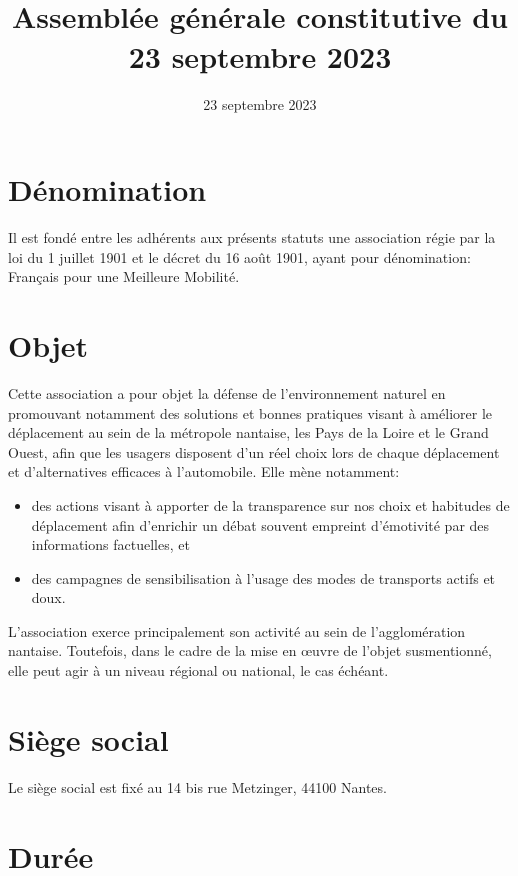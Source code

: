 \documentclass[11 pt]{article}
\title{\fmm \\[4mm]
\large Assemblée générale constitutive du 23 septembre 2023}
\date{23 septembre 2023}
\newcommand\fmm[0]{Français pour une Meilleure Mobilité}
\begin{document}
\maketitle

\section{Dénomination}

Il est fondé entre les adhérents aux présents statuts une association
régie par la loi du 1\ier{} juillet 1901 et le décret du 16 août 1901,
ayant pour dénomination: \og\fmm\fg.


\section{Objet}

Cette association a pour objet la défense de l’environnement naturel
en promouvant notamment des solutions et bonnes pratiques visant à
améliorer le déplacement au sein de la métropole nantaise, les Pays de
la Loire et le Grand Ouest, afin que les usagers disposent d’un réel
choix lors de chaque déplacement et d’alternatives efficaces à
l’automobile. Elle mène notamment:

\begin{itemize}
\item des actions visant à apporter de la transparence sur nos choix
  et habitudes de déplacement afin d’enrichir un débat souvent
  empreint d’émotivité par des informations factuelles, et
\item des campagnes de sensibilisation à l’usage des modes de
  transports actifs et doux.
\end{itemize}

L’association exerce principalement son activité au sein de
l’agglomération nantaise. Toutefois, dans le cadre de la mise en
œuvre de l’objet susmentionné, elle peut agir à un niveau régional ou
national, le cas échéant.

\section{Siège social}

Le siège social est fixé au 14 bis rue Metzinger, 44100 Nantes.

\section{Durée}
\end{document}
